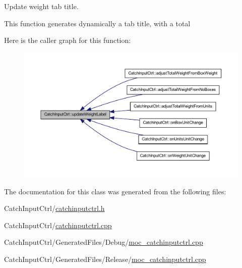 Update weight tab title. 

This function generates dynamically a tab title, with a total 

Here is the caller graph for this function:
\nopagebreak
\begin{figure}[H]
\begin{center}
\leavevmode
\includegraphics[width=400pt]{class_catch_input_ctrl_ab8e1629f9e58b12262a146f58d9309fe_icgraph}
\end{center}
\end{figure}




The documentation for this class was generated from the following files:\begin{DoxyCompactItemize}
\item 
CatchInputCtrl/\hyperlink{catchinputctrl_8h}{catchinputctrl.h}\item 
CatchInputCtrl/\hyperlink{catchinputctrl_8cpp}{catchinputctrl.cpp}\item 
CatchInputCtrl/GeneratedFiles/Debug/\hyperlink{_debug_2moc__catchinputctrl_8cpp}{moc\_\-catchinputctrl.cpp}\item 
CatchInputCtrl/GeneratedFiles/Release/\hyperlink{_release_2moc__catchinputctrl_8cpp}{moc\_\-catchinputctrl.cpp}\end{DoxyCompactItemize}
